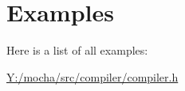 \section{Examples}
Here is a list of all examples:\begin{DoxyCompactItemize}
\item 
\hyperlink{_y_1_2mocha_2src_2compiler_2compiler_8h-example}{Y:/mocha/src/compiler/compiler.h}
\end{DoxyCompactItemize}
